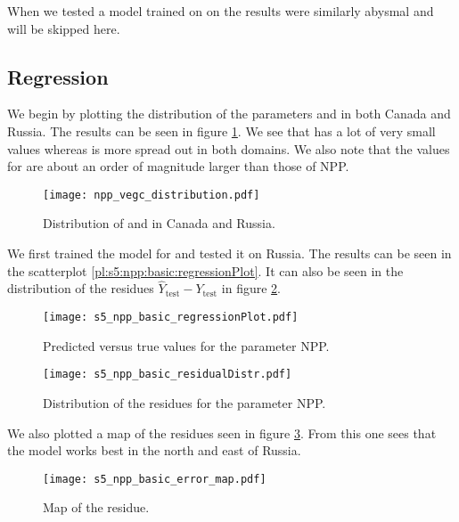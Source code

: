 When we tested a model trained on  on  the results were similarly abysmal and will be skipped here.

\subsection{Regression}

We begin by plotting the distribution of the parameters  and  in both Canada and Russia. The results can be
seen in figure \ref{pl:npp_vegc_distribution}. We see that  has a lot of very small values whereas  is more spread out
in both domains. We also note that the values for  are about an order of magnitude larger than those of NPP.
\begin{figure}[h]
  \centering
  \texttt{[image: npp\_vegc\_distribution.pdf]}
  \caption{Distribution of  and  in Canada and Russia.}
  \label{pl:npp_vegc_distribution}
\end{figure}

We first trained the model for  and tested it on Russia. The results 
can be seen in the scatterplot \ref{pl:s5:npp:basic:regressionPlot}. It can also be seen in the distribution
 of the residues $\hat{Y}_\text{test}-Y_\text{test}$ in figure \ref{pl:s5:npp:basic:residualDistr}.
\begin{figure}[h]
  \centering
  \begin{minipage}{0.45\textwidth}
    \centering
    \texttt{[image: s5\_npp\_basic\_regressionPlot.pdf]}
    \caption{Predicted versus true values for the parameter NPP.}
    \label{pl:s5:npp:basic:regressionPlot}
  \end{minipage}
  \hfill
  \begin{minipage}{0.45\textwidth}
    \centering
    \texttt{[image: s5\_npp\_basic\_residualDistr.pdf]}
    \caption{Distribution of the residues for the parameter NPP.}
    \label{pl:s5:npp:basic:residualDistr}
  \end{minipage}
\end{figure}
We also plotted a map of the residues seen in figure \ref{pl:s5_npp_basic_error_map}. From this one sees that the model works best in the north and east of Russia.
\begin{figure}[h]
  \centering
  \texttt{[image: s5\_npp\_basic\_error\_map.pdf]}
  \caption{Map of the residue.}
  \label{pl:s5_npp_basic_error_map}
\end{figure}

